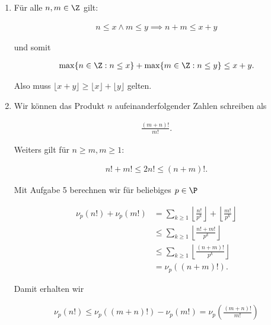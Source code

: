 \begin{solution}

\phantom{}

\begin{enumerate}[label = (\alph*)]
    \item Für alle $n,m \in \Z$ gilt:
    
    \begin{align*}
        n \leq x \land m \leq y \implies n + m \leq x + y
    \end{align*}

    und somit

    \begin{align*}
        \max\{n \in \Z: n \leq x\} + \max\{m \in \Z: n \leq y\} \leq x + y.
    \end{align*}

    Also muss $\lfloor x + y \rfloor \geq \lfloor x \rfloor + \lfloor y \rfloor$ gelten.
    \item
    Wir können das Produkt $n$ aufeinanderfolgender Zahlen schreiben als

    \begin{align*}
        \frac{(m+n)!}{m!}.
    \end{align*}

    Weiters gilt für $n \geq m, m \geq 1$:

    \begin{align*}
        n! + m! \leq 2n! \leq (n+m)!.
    \end{align*}

    Mit Aufgabe 5 berechnen wir für beliebiges $p \in \P$

    \begin{align*}
        \nu_p(n!) + \nu_p(m!) &= \sum_{k\geq 1} 
        \left\lfloor \frac{n!}{p^k} \right\rfloor + \left\lfloor \frac{m!}{p^k} \right\rfloor\\
        &\leq \sum_{k\geq 1} 
        \left\lfloor \frac{n!+m!}{p^k} \right\rfloor \\
        &\leq \sum_{k\geq 1} 
        \left\lfloor \frac{(n+m)!}{p^k} \right\rfloor \\
        &= \nu_p\left((n+m)!\right).
    \end{align*}

    Damit erhalten wir

    \begin{align*}
        \nu_p(n!) \leq \nu_p\left((m+n)!\right) - \nu_p(m!) = \nu_p\left(\frac{(m+n)!}{m!}\right)
    \end{align*}


\end{enumerate}
\end{solution}
